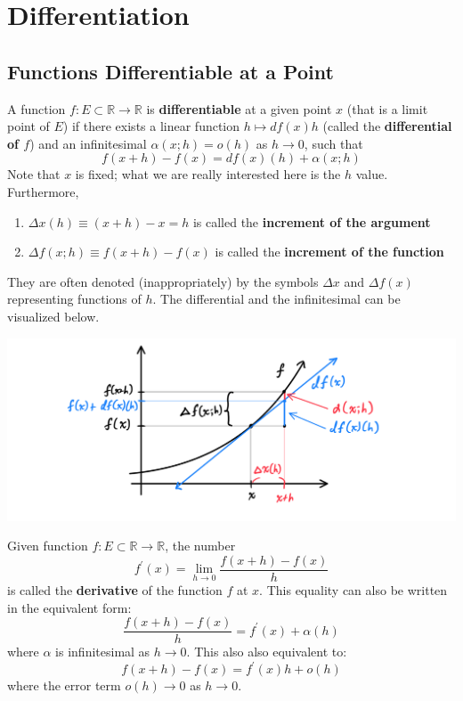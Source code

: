 \section{Differentiation}

\subsection{Functions Differentiable at a Point}

  \begin{definition}
    A function $f: E \subset \mathbb{R} \longrightarrow \mathbb{R}$ is \textbf{differentiable} at a given point $x$ (that is a limit point of $E$) if there exists a linear function $h \mapsto df(x) h$ (called the \textbf{differential of $f$}) and an infinitesimal $\alpha (x;h) = o(h)$ as $h \rightarrow 0$, such that
    \[f(x + h) - f(x) = df(x) (h) + \alpha (x; h)\]
    Note that $x$ is fixed; what we are really interested here is the $h$ value. Furthermore, 
    \begin{enumerate}
      \item $\Delta x(h) \equiv (x + h) - x = h$ is called the \textbf{increment of the argument}
      \item $\Delta f(x;h) \equiv f(x + h) - f(x)$ is called the \textbf{increment of the function} 
    \end{enumerate}
    They are often denoted (inappropriately) by the symbols $\Delta x$ and $\Delta f(x)$ representing functions of $h$. The differential and the infinitesimal can be visualized below. 
    \begin{center}
        \includegraphics[scale=0.25]{img/Differential_Diagram.PNG}
    \end{center}
  \end{definition}

  \begin{definition}[Derivative]
    Given function $f: E \subset \mathbb{R} \longrightarrow \mathbb{R}$, the number
    \[f^\prime (x) = \lim_{h \rightarrow 0} \frac{f(x+h) - f(x)}{h}\]
    is called the \textbf{derivative} of the function $f$ at $x$. This equality can also be written in the equivalent form: 
    \[\frac{f(x+h) - f(x)}{h} = f^\prime (x) + \alpha (h)\]
    where $\alpha$ is infinitesimal as $h \rightarrow 0$. This also also equivalent to:
    \[f(x+h) - f(x) = f^\prime (x) h + o (h)\]
    where the error term $o(h) \rightarrow 0$ as $h \rightarrow 0$. 
  \end{definition}

